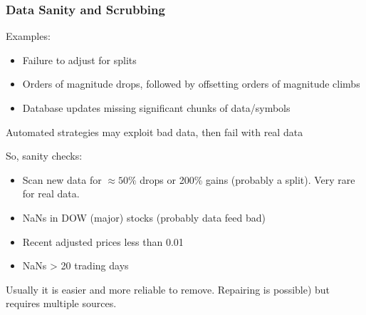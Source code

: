 \documentclass{scrartcl}
\begin{document}
\subsubsection{Data Sanity and Scrubbing}
\label{sec:DataSanity}
Examples:
\begin{itemize}
\item Failure to adjust for splits
\item Orders of magnitude drops, followed by offsetting orders of magnitude
  climbs
\item Database updates missing significant chunks of data/symbols
\end{itemize}
Automated strategies may exploit bad data, then fail with real data

So, sanity checks:
\begin{itemize}
\item Scan new data for $\approx 50\%$ drops or 200\% gains (probably a split).
  Very rare for real data.
\item NaNs in DOW (major) stocks (probably data feed bad)
\item Recent adjusted prices less than 0.01
\item NaNs > 20 trading days
\end{itemize}

Usually it is easier and more reliable to remove. Repairing is possible) but
requires multiple sources. 
\end{document}
